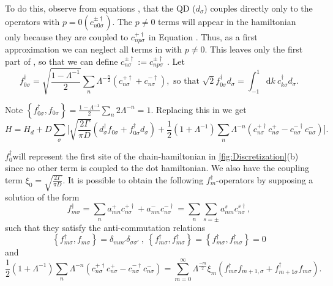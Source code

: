 To do this, observe from equations ,
that the QD ($d_{\sigma}$) couples directly only to the operators
with $p=0$$\left(c_{n0\sigma}^{\pm\dagger}\right)$. The $p\neq0$
terms will appear in the hamiltonian only because they are coupled
to $c_{np\sigma}^{+\dagger}$ in Equation .
Thus, as a first approximation we can neglect all terms in 
with $p\neq0$. This leaves only the first part of ,
so that we can define $c_{n\sigma}^{\pm\dagger}:=c_{np\sigma}^{\pm\dagger}$
. Let 
\begin{equation}
f_{0\sigma}^{\dagger}=\sqrt{\frac{1-\Lambda^{-1}}{2}}\sum_{n}\Lambda^{-\frac{n}{2}}\left(c_{n\sigma}^{+\dagger}+c_{n\sigma}^{-\dagger}\right),\mbox{ so that }\sqrt{2}f_{0\sigma}^{\dagger}d_{\sigma}=\int_{-1}^{1}\mbox{d}k\ c_{k\sigma}^{\dagger}d_{\sigma}.\label{eq:f_0}
\end{equation}


Note $\left\{ f_{0\sigma}^{\dagger},f_{0\sigma}\right\} =\frac{1-\Lambda^{-1}}{2}\sum_{n}2\Lambda^{-n}=1$.
Replacing this in we get 
\[
H=H_{d}+D\sum_{\sigma}\Biggl[\sqrt{\frac{2\Gamma}{\pi D}}\left(d_{\sigma}^{\dagger}f_{0\sigma}+f_{0\sigma}^{\dagger}d_{\sigma}\right)+\frac{1}{2}\left(1+\Lambda^{-1}\right)\sum_{n}\Lambda^{-n}\left(c_{n\sigma}^{+\dagger}c_{n\sigma}^{+}-c_{n\sigma}^{-\dagger}c_{n\sigma}^{-}\right)\Biggr].
\]


$f_{0}^{\dagger}$will represent the first site of the chain-hamiltonian
in \ref{fig:Discretization}(b) since no other term is coupled to the dot hamiltonian.
We also have the coupling term $\xi_{0}=\sqrt{\frac{2\Gamma}{\pi D}}$.
It is possible to obtain the following $f_{m}^{\dagger}$-operators
by supposing a solution of the form 
\begin{equation}
f_{m\sigma}^{\dagger}=\sum_{n}a_{mn}^{+}c_{n\sigma}^{+\dagger}+a_{mn}^{-}c_{n\sigma}^{-\dagger}=\sum_{n}\sum_{s=\pm}a_{mn}^{s}c_{n\sigma}^{s\dagger},\label{eq:chain elements}
\end{equation}
 such that they satisfy the anti-commutation relations 
\[
\left\{ f_{m\sigma}^{\dagger},f_{m\sigma}\right\} =\delta_{mm'}\delta_{\sigma\sigma'}\ ,\ \left\{ f_{m\sigma}^{\dagger},f_{m\sigma}^{\dagger}\right\} =\left\{ f_{m\sigma}^{\dagger},f_{m\sigma}^{\dagger}\right\} =0
\]
and 
\begin{equation}
\frac{1}{2}\left(1+\Lambda^{-1}\right)\sum_{n}\Lambda^{-n}\left(c_{n\sigma}^{+\dagger}c_{n\sigma}^{+}-c_{n\sigma}^{-\dagger}c_{n\sigma}^{-}\right)=\sum_{m=0}^{\infty}\Lambda^{\frac{-m}{2}}\xi_{m}\left(f_{m\sigma}^{\dagger}f_{m+1,\sigma}+f_{m+1\sigma}^{\dagger}f_{m\sigma}\right).\label{eq:final equation}
\end{equation}


